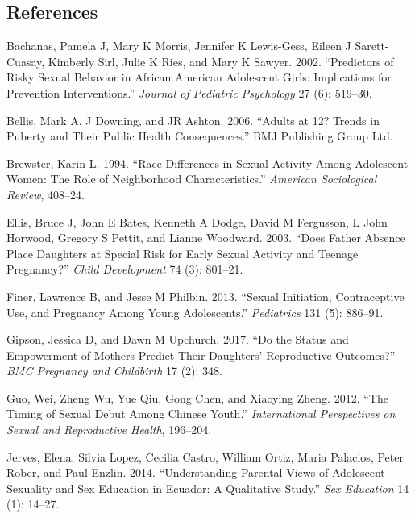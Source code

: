 \documentclass[
]{article}
\newlength{\cslhangindent}
\newenvironment{cslreferences}%
  {\setlength{\parindent}{0pt}%
  \everypar{\setlength{\hangindent}{\cslhangindent}}\ignorespaces}%
  {\par}
\begin{document}
\hypertarget{references}{%
\subsection*{References}\label{references}}

\hypertarget{refs}{}
\begin{cslreferences}
\leavevmode\hypertarget{ref-bachanas2002predictors}{}%
Bachanas, Pamela J, Mary K Morris, Jennifer K Lewis-Gess, Eileen J
Sarett-Cuasay, Kimberly Sirl, Julie K Ries, and Mary K Sawyer. 2002.
``Predictors of Risky Sexual Behavior in African American Adolescent
Girls: Implications for Prevention Interventions.'' \emph{Journal of
Pediatric Psychology} 27 (6): 519--30.

\leavevmode\hypertarget{ref-bellis2006adults}{}%
Bellis, Mark A, J Downing, and JR Ashton. 2006. ``Adults at 12? Trends
in Puberty and Their Public Health Consequences.'' BMJ Publishing Group
Ltd.

\leavevmode\hypertarget{ref-brewster1994race}{}%
Brewster, Karin L. 1994. ``Race Differences in Sexual Activity Among
Adolescent Women: The Role of Neighborhood Characteristics.''
\emph{American Sociological Review}, 408--24.

\leavevmode\hypertarget{ref-ellis2003does}{}%
Ellis, Bruce J, John E Bates, Kenneth A Dodge, David M Fergusson, L John
Horwood, Gregory S Pettit, and Lianne Woodward. 2003. ``Does Father
Absence Place Daughters at Special Risk for Early Sexual Activity and
Teenage Pregnancy?'' \emph{Child Development} 74 (3): 801--21.

\leavevmode\hypertarget{ref-finer2013sexual}{}%
Finer, Lawrence B, and Jesse M Philbin. 2013. ``Sexual Initiation,
Contraceptive Use, and Pregnancy Among Young Adolescents.''
\emph{Pediatrics} 131 (5): 886--91.

\leavevmode\hypertarget{ref-gipson2017status}{}%
Gipson, Jessica D, and Dawn M Upchurch. 2017. ``Do the Status and
Empowerment of Mothers Predict Their Daughters' Reproductive Outcomes?''
\emph{BMC Pregnancy and Childbirth} 17 (2): 348.

\leavevmode\hypertarget{ref-guo2012timing}{}%
Guo, Wei, Zheng Wu, Yue Qiu, Gong Chen, and Xiaoying Zheng. 2012. ``The
Timing of Sexual Debut Among Chinese Youth.'' \emph{International
Perspectives on Sexual and Reproductive Health}, 196--204.

\leavevmode\hypertarget{ref-jerves2014understanding}{}%
Jerves, Elena, Silvia Lopez, Cecilia Castro, William Ortiz, Maria
Palacios, Peter Rober, and Paul Enzlin. 2014. ``Understanding Parental
Views of Adolescent Sexuality and Sex Education in Ecuador: A
Qualitative Study.'' \emph{Sex Education} 14 (1): 14--27.


\end{cslreferences}
\end{document}
